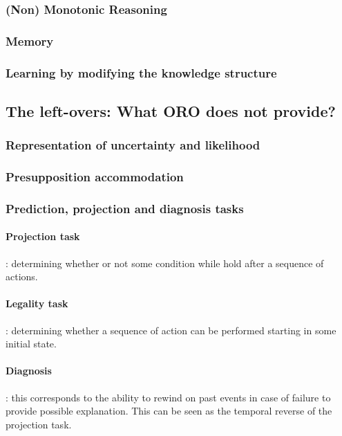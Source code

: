 \subsubsection{(Non) Monotonic Reasoning}


\subsubsection{Memory}
\label{subssect|memory}


\subsubsection{Learning by modifying the knowledge structure}

\subsection{The left-overs: What ORO does not provide?}

\subsubsection{Representation of uncertainty and likelihood}

\subsubsection{Presupposition accommodation}
\subsubsection{Prediction, projection and diagnosis tasks}
\paragraph{Projection task}: determining whether or not some condition while
hold after a sequence of actions.

\paragraph{Legality task}: determining whether a sequence of action can be
performed starting in some initial state.

\paragraph{Diagnosis}: this corresponds to the ability to rewind on past events
in case of failure to provide possible explanation. This can be seen as the
temporal reverse of the projection task.


